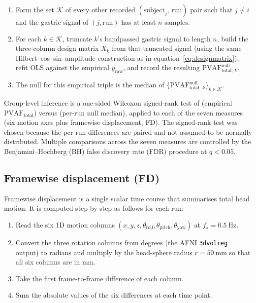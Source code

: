\documentclass[11pt]{article}
\newcommand{\PVAF}{\mathrm{PVAF}}
\begin{document}
\begin{enumerate}
\item Form the set $\mathcal{K}$ of every other recorded
$(\text{subject}_{j},\,\text{run})$ pair such that $j \neq i$ and the
gastric signal of $(j,\text{run})$ has at least $n$ samples.
\item For each $k\in\mathcal{K}$, truncate $k$'s bandpassed gastric
signal to length $n$, build the three-column design matrix $X_k$ from
that truncated signal (using the same Hilbert--cos--sin--amplitude
construction as in equation~\ref{eq:designmatrix}), refit OLS against
the empirical $y_{\text{raw}}$, and record the resulting
$\PVAF^{\text{null}}_{\text{total},\,k}$.
\item The null for this empirical triple is the median of
$\{\PVAF^{\text{null}}_{\text{total},\,k}\}_{k\in\mathcal{K}}$.
\end{enumerate}

Group-level inference is a one-sided Wilcoxon signed-rank test of
(empirical $\PVAF_{\text{total}}$) versus (per-run null median),
applied to each of the seven measures (six motion axes plus framewise
displacement, FD). The signed-rank test was chosen because the
per-run differences are paired and not assumed to be normally
distributed. Multiple comparisons across the seven measures are
controlled by the Benjamini--Hochberg (BH) false discovery rate (FDR)
procedure at $q < 0.05$.

\subsection{Framewise displacement (FD)}

Framewise displacement is a single scalar time course that summarises
total head motion. It is computed step by step as follows for each run:
\begin{enumerate}
\item Read the six 1D motion columns
$(x, y, z, \theta_{\text{roll}}, \theta_{\text{pitch}},
\theta_{\text{yaw}})$ at $f_s = \SI{0.5}{\hertz}$.
\item Convert the three rotation columns from degrees (the AFNI
\texttt{3dvolreg} output) to radians and multiply by the head-sphere
radius $r = \SI{50}{\milli\meter}$ so that all six columns are in mm.
\item Take the first frame-to-frame difference of each column.
\item Sum the absolute values of the six differences at each time
point.
\end{enumerate}
\end{document}
